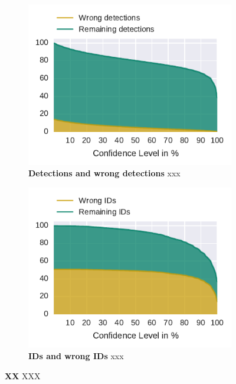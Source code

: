 \begin{figure}
    \centering
    \begin{subfigure}[b]{0.45\textwidth}
        \includegraphics[width=\textwidth]{Figures/detectionsWrongConf}
        \caption[Detections]{ \textbf{Detections and wrong detections} xxx}
        \label{fig:detections}
    \end{subfigure}
    \begin{subfigure}[b]{0.45\textwidth}
        \includegraphics[width=\textwidth]{Figures/idsWrongConf}
        \caption[IDs]{\textbf{IDs and wrong IDs} xxx}
        \label{fig:ids}
    \end{subfigure}
 	\caption[XX]{\textbf{XX} XXX}
 	\label{fig:remainingVSquality}
 \end{figure}


